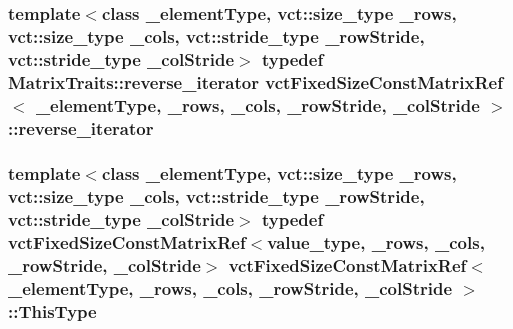 \hypertarget{classvct_fixed_size_const_matrix_ref_a1c9aa87e0184cf645405b6c8618f1223}{
\subsubsection[{reverse\-\_\-iterator}]{\setlength{\rightskip}{0pt plus 5cm}template$<$class \-\_\-element\-Type, vct\-::size\-\_\-type \-\_\-rows, vct\-::size\-\_\-type \-\_\-cols, vct\-::stride\-\_\-type \-\_\-row\-Stride, vct\-::stride\-\_\-type \-\_\-col\-Stride$>$ typedef {\bf Matrix\-Traits\-::reverse\-\_\-iterator} {\bf vct\-Fixed\-Size\-Const\-Matrix\-Ref}$<$ \-\_\-element\-Type, \-\_\-rows, \-\_\-cols, \-\_\-row\-Stride, \-\_\-col\-Stride $>$\-::{\bf reverse\-\_\-iterator}}}\label{classvct_fixed_size_const_matrix_ref_a1c9aa87e0184cf645405b6c8618f1223}
\hypertarget{classvct_fixed_size_const_matrix_ref_a725e99847915984b03843f96054b07d5}{
\subsubsection[{This\-Type}]{\setlength{\rightskip}{0pt plus 5cm}template$<$class \-\_\-element\-Type, vct\-::size\-\_\-type \-\_\-rows, vct\-::size\-\_\-type \-\_\-cols, vct\-::stride\-\_\-type \-\_\-row\-Stride, vct\-::stride\-\_\-type \-\_\-col\-Stride$>$ typedef {\bf vct\-Fixed\-Size\-Const\-Matrix\-Ref}$<$value\-\_\-type, \-\_\-rows, \-\_\-cols, \-\_\-row\-Stride, \-\_\-col\-Stride$>$ {\bf vct\-Fixed\-Size\-Const\-Matrix\-Ref}$<$ \-\_\-element\-Type, \-\_\-rows, \-\_\-cols, \-\_\-row\-Stride, \-\_\-col\-Stride $>$\-::{\bf This\-Type}}}\label{classvct_fixed_size_const_matrix_ref_a725e99847915984b03843f96054b07d5}


